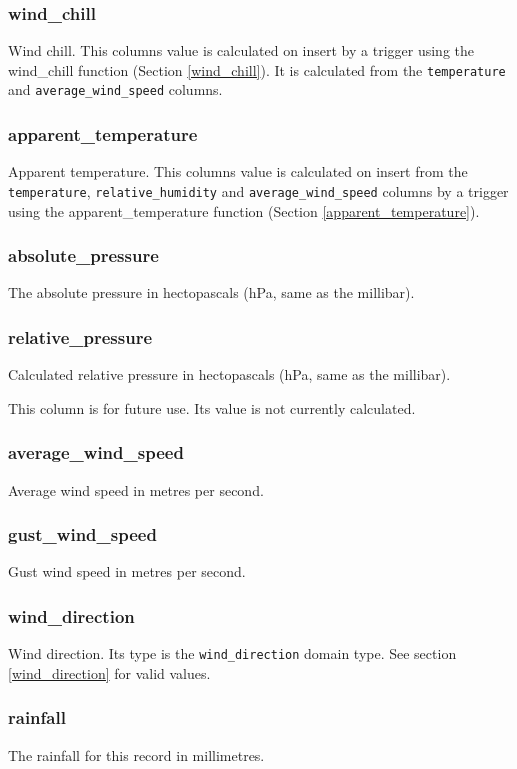 \documentclass[a4paper,10pt]{book}
\begin{document}
\subsubsection{wind\_chill}
Wind chill. This columns value is calculated on insert by a trigger using the wind\_chill function (Section \ref{wind_chill}). It is calculated from the \verb|temperature| and \verb|average_wind_speed| columns.

\subsubsection{apparent\_temperature}
Apparent temperature. This columns value is calculated on insert from the \verb|temperature|, \verb|relative_humidity| and \verb|average_wind_speed| columns by a trigger using the apparent\_temperature function (Section \ref{apparent_temperature}).

\subsubsection{absolute\_pressure}
The absolute pressure in hectopascals (hPa, same as the millibar).

\subsubsection{relative\_pressure}
Calculated relative pressure in hectopascals (hPa, same as the millibar).

This column is for future use. Its value is not currently calculated.

\subsubsection{average\_wind\_speed}
Average wind speed in metres per second.

\subsubsection{gust\_wind\_speed}
Gust wind speed in metres per second.

\subsubsection{wind\_direction}
Wind direction. Its type is the \verb|wind_direction| domain type. See section \ref{wind_direction} for valid values.

\subsubsection{rainfall}
The rainfall for this record in millimetres.
\end{document}
